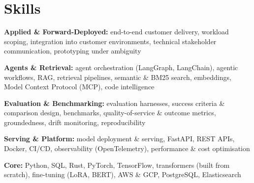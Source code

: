 \documentclass[10pt,a4paper]{article}
\begin{document}
\section{Skills}
\begin{tight}
  \item[\textcolor{accent}{\small$\bullet$}] \textbf{Applied \& Forward-Deployed:} end-to-end customer delivery, workload scoping, integration into customer environments, technical stakeholder communication, prototyping under ambiguity
  \item[\textcolor{accent}{\small$\bullet$}] \textbf{Agents \& Retrieval:} agent orchestration (LangGraph, LangChain), agentic workflows, RAG, retrieval pipelines, semantic \& BM25 search, embeddings, Model Context Protocol (MCP), code intelligence
  \item[\textcolor{accent}{\small$\bullet$}] \textbf{Evaluation \& Benchmarking:} evaluation harnesses, success criteria \& comparison design, benchmarks, quality-of-service \& outcome metrics, groundedness, drift monitoring, reproducibility
  \item[\textcolor{accent}{\small$\bullet$}] \textbf{Serving \& Platform:} model deployment \& serving, FastAPI, REST APIs, Docker, CI/CD, observability (OpenTelemetry), performance \& cost optimisation
  \item[\textcolor{accent}{\small$\bullet$}] \textbf{Core:} Python, SQL, Rust, PyTorch, TensorFlow, transformers (built from scratch), fine-tuning (LoRA, BERT), AWS \& GCP, PostgreSQL, Elasticsearch
\end{tight}

\end{document}
